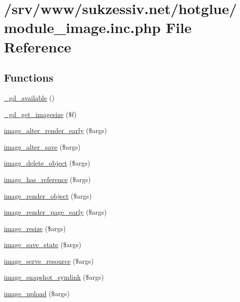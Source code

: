 \hypertarget{module__image_8inc_8php}{
\section{/srv/www/sukzessiv.net/hotglue/module\_\-image.inc.php File Reference}
\label{module__image_8inc_8php}
}
\subsection*{Functions}
\begin{CompactItemize}
\item 
\hyperlink{module__image_8inc_8php_574d6d760e50b88ffa815cab30a5e634}{\_\-gd\_\-available} ()
\item 
\hyperlink{module__image_8inc_8php_3c76028c34273e722c9691243377a208}{\_\-gd\_\-get\_\-imagesize} (\$f)
\item 
\hyperlink{module__image_8inc_8php_b52d6b71a5c26dbb7e86653652a23251}{image\_\-alter\_\-render\_\-early} (\$args)
\item 
\hyperlink{module__image_8inc_8php_93578776fb38b10d47bc711cc3469ae9}{image\_\-alter\_\-save} (\$args)
\item 
\hyperlink{module__image_8inc_8php_7cbcf6138ccff16a8b733cfd6f0f1666}{image\_\-delete\_\-object} (\$args)
\item 
\hyperlink{module__image_8inc_8php_0bef6164f5eafe368d251639cf6fe298}{image\_\-has\_\-reference} (\$args)
\item 
\hyperlink{module__image_8inc_8php_4fadded2a225d1b5ea73404a84597620}{image\_\-render\_\-object} (\$args)
\item 
\hyperlink{module__image_8inc_8php_8266a74a11a86a73e2aa3709388fd43f}{image\_\-render\_\-page\_\-early} (\$args)
\item 
\hyperlink{module__image_8inc_8php_9e03a71310133176236ae0bd4a0241e0}{image\_\-resize} (\$args)
\item 
\hyperlink{module__image_8inc_8php_c26ea1448f0b7ed835907cf7c22b60ca}{image\_\-save\_\-state} (\$args)
\item 
\hyperlink{module__image_8inc_8php_bb6646bfaa6a012e620cdaaa0bc3c807}{image\_\-serve\_\-resource} (\$args)
\item 
\hyperlink{module__image_8inc_8php_65d33fafe2da58d0f87f2df1fedbbe62}{image\_\-snapshot\_\-symlink} (\$args)
\item 
\hyperlink{module__image_8inc_8php_37dee9de60e2852c0631d8e60e58585c}{image\_\-upload} (\$args)
\end{CompactItemize}


